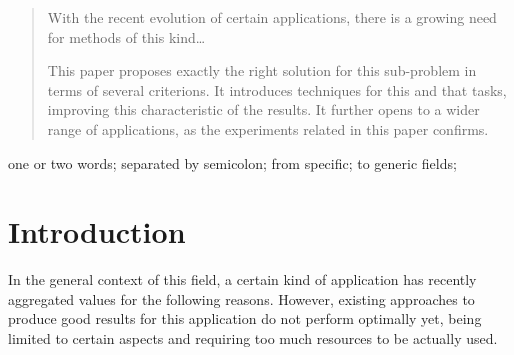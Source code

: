 \documentclass[10pt, conference]{IEEEtran}
\begin{document}



\maketitle


\begin{abstract}
With the recent evolution of certain applications, there is a growing need for methods of this kind\ldots{}

This paper proposes exactly the right solution for this sub-problem in terms of several criterions. It introduces techniques for this and that tasks, improving this characteristic of the results. It further opens to a wider range of applications, as the experiments related in this paper confirms.

%
\end{abstract}

\begin{IEEEkeywords}
one or two words; separated by semicolon; from specific; to generic fields;

\end{IEEEkeywords}


\IEEEpeerreviewmaketitle





\section{Introduction}
%
In the general context of this field, a certain kind of application has recently aggregated values for the following reasons.
%
However, existing approaches to produce good results for this application do not perform optimally yet, being limited to certain aspects and requiring too much resources to be actually used.
\end{document}
